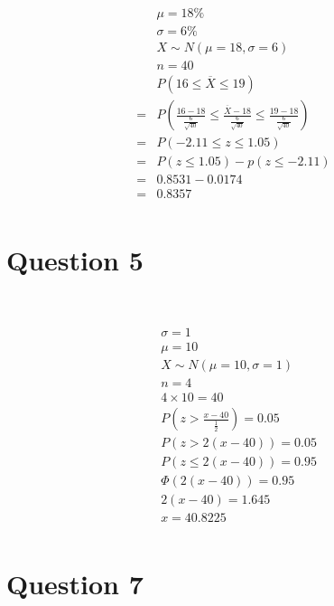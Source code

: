 \documentclass{article}
\begin{document}
\begin{align*}
    &\mu=18\%\\
    &\sigma=6\%\\
    &X\sim N(\mu=18,\sigma=6)\\
    &n=40\\
    &P(16\leqslant\overline{X}\leqslant19)\\
    =&P(\frac{16-18}{\frac{6}{\sqrt{40}}}\leqslant\frac{\overline{X}-18}{\frac{6}{\sqrt{40}}}\leqslant\frac{19-18}{\frac{6}{\sqrt{40}}})\\
    =&P(-2.11\leqslant z\leqslant 1.05)\\
    =&P(z\leqslant1.05)-p(z\leqslant -2.11)\\
    =&0.8531-0.0174\\
    =&0.8357\\
\end{align*}

\newpage

\section*{Question 5}

~

\begin{align*}
    &\sigma=1\\
    &\mu=10\\
    &X\sim N(\mu=10,\sigma=1)\\
    &n=4\\
    &4\times10=40\\
    &P(z>\frac{x-40}{\frac{1}{2}})=0.05\\
    &P(z>2(x-40))=0.05\\
    &P(z\leqslant2(x-40))=0.95\\
    &\Phi(2(x-40))=0.95\\
    &2(x-40)=1.645\\
    &x=40.8225\\
\end{align*}

\newpage

\section*{Question 7}

~
\end{document}
